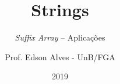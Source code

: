 \title{Strings}
\subtitle{{\it Suffix Array} -- Aplicações}
\author{Prof. Edson Alves - UnB/FGA}
\date{2019}
